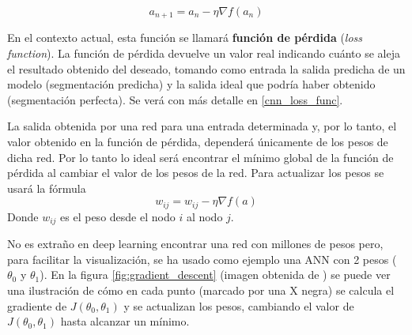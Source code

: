 \begin{equation}\label{eqn:gradient_descent}
a_{n+1} = a_n - \eta \nabla f (a_n)
\end{equation}

En el contexto actual, esta función se llamará \textbf{función de pérdida} (\textit{loss function}). La función de pérdida devuelve un valor real indicando cuánto se aleja el resultado obtenido del deseado, tomando como entrada la salida predicha de un modelo (segmentación predicha) y la salida ideal que podría haber obtenido (segmentación perfecta). Se verá con más detalle en \ref{cnn_loss_func}.

La salida obtenida por una red para una entrada determinada y, por lo tanto, el valor obtenido en la función de pérdida, dependerá únicamente de los pesos de dicha red. Por lo tanto lo ideal será encontrar el mínimo global de la función de pérdida al cambiar el valor de los pesos de la red. Para actualizar los pesos se usará la fórmula 
\begin{equation}\label{eqn:weight_update}
w_{ij} = w_{ij} - \eta \nabla f(a)
\end{equation}
Donde $w_{ij}$ es el peso desde el nodo $i$ al nodo $j$.

No es extraño en deep learning encontrar una red con millones de pesos pero, para facilitar la visualización, se ha usado como ejemplo una ANN con 2 pesos ($\theta_0$ y $\theta_1$). En la figura \ref{fig:gradient_descent} (imagen obtenida de \cite{kdnuggets}) se puede ver una ilustración de cómo en cada punto (marcado por una X negra) se calcula el gradiente de $J(\theta_0, \theta_1)$ y se actualizan los pesos, cambiando el valor de $J(\theta_0, \theta_1)$ hasta alcanzar un mínimo.

